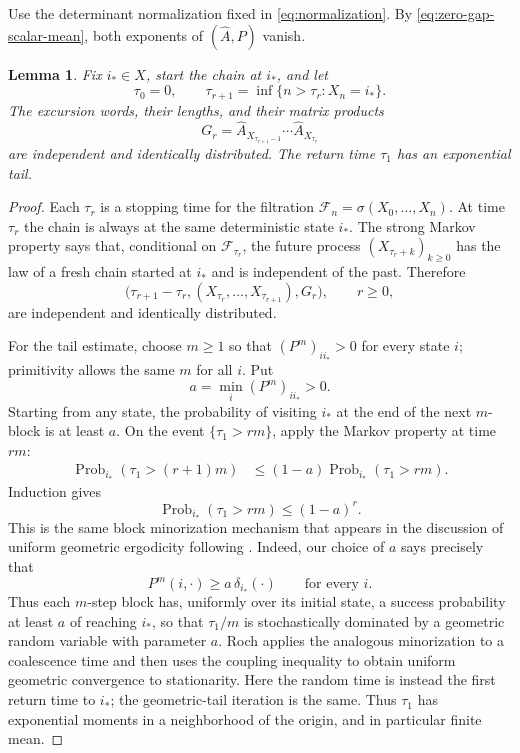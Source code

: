 \documentclass[11pt,a4paper]{amsart}
\newtheorem{lemma}[theorem]{Lemma}
\theoremstyle{definition}
\theoremstyle{remark}
\numberwithin{equation}{section}
\newcommand{\Prob}{\operatorname{Prob}}
\newcommand{\1}{\boldsymbol 1}
\begin{document}
Use the determinant normalization fixed in
\eqref{eq:normalization}.  By \eqref{eq:zero-gap-scalar-mean}, both
exponents of \((\widehat A,P)\) vanish.

\begin{lemma}%
\label{lem:regeneration}
Fix $i_*\in X$, start the chain at $i_*$, and let
$$
 \tau_0=0,
 \qquad \tau_{r+1}=\inf\{n>\tau_r:X_n=i_*\}.
$$
The excursion words, their lengths, and their matrix products
$$
 G_r=\widehat A_{X_{\tau_{r+1}-1}}\cdots
     \widehat A_{X_{\tau_r}}
$$
are independent and identically distributed.  The return time
$\tau_1$ has an exponential tail.
\end{lemma}

\begin{proof}
Each $\tau_r$ is a stopping time for the filtration
$\mathcal F_n=\sigma(X_0,\ldots,X_n)$.  At time $\tau_r$ the chain
is always at the same deterministic state $i_*$.  The strong Markov
property says that, conditional on $\mathcal F_{\tau_r}$, the future
process $(X_{\tau_r+k})_{k\ge0}$ has the law of a fresh chain started
at $i_*$ and is independent of the past.  Therefore
$$
 \bigl(\tau_{r+1}-\tau_r,
       (X_{\tau_r},\ldots,X_{\tau_{r+1}}),G_r\bigr),
 \qquad r\ge0,
$$
are independent and identically distributed.

For the tail estimate, choose $m\ge1$ so that
$(P^m)_{ii_*}>0$ for every state $i$; primitivity allows the same
$m$ for all $i$.  Put
$$
 a=\min_i(P^m)_{ii_*}>0.
$$
Starting from any state, the probability of visiting $i_*$ at the end
of the next $m$-block is at least $a$.  On the event
$\{\tau_1>rm\}$, apply the Markov property at time $rm$:
\begin{align*}
 \Prob_{i_*}(\tau_1>(r+1)m)
 &\le(1-a)\Prob_{i_*}(\tau_1>rm).
\end{align*}
Induction gives
\begin{equation}\label{eq:return-tail-expanded}
 \Prob_{i_*}(\tau_1>rm)\le(1-a)^r.
\end{equation}
This is the same block minorization mechanism that appears in the
discussion of uniform geometric ergodicity following
\cite[Theorem~4.3.2]{Roch}.  Indeed, our choice of $a$ says precisely
that
$$
 P^m(i,\mathord\cdot)\ge a\,\delta_{i_*}(\mathord\cdot)
 \qquad\text{for every }i.
$$
Thus each $m$-step block has, uniformly over its initial state, a
success probability at least $a$ of reaching $i_*$, so that
$\tau_1/m$ is stochastically dominated by a geometric random variable
with parameter $a$.  Roch applies the analogous minorization to a
coalescence time and then uses the coupling inequality to obtain uniform
geometric convergence to stationarity.  Here the random time is instead
the first return time to $i_*$; the geometric-tail iteration is the
same.
Thus $\tau_1$ has exponential moments in a neighborhood of the
origin, and in particular finite mean.
\end{proof}
\end{document}
